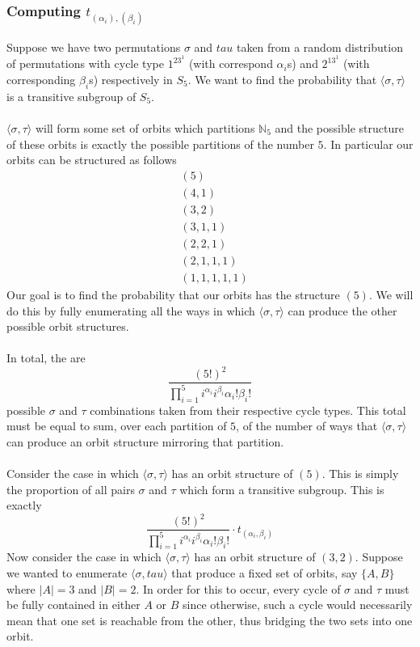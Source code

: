 \subsubsection{Computing $t_{(\alpha_i), (\beta_i)}$}
Suppose we have two permutations $\sigma$ and $tau$ taken from a random distribution of permutations with cycle type $1^23^1$ (with correspond $\alpha_i$s)  and $2^13^1$ (with corresponding $\beta_i$s) respectively in $S_5$. We want to find the probability that $\langle \sigma, \tau \rangle$ is a transitive subgroup of $S_5$.
\\\\$\langle \sigma, \tau \rangle$ will form some set of orbits which partitions $\mathbb{N}_5$ and the possible structure of these orbits is exactly the possible partitions of the number $5$. In particular our orbits can be structured as follows
	\begin{align*}
		 & (5)             \\
		 & (4, 1)          \\
		 & (3, 2)          \\
		 & (3, 1, 1)       \\
		 & (2, 2, 1)       \\
		 & (2, 1, 1, 1)    \\
		 & (1, 1, 1, 1, 1)
	\end{align*}
	Our goal is to find the probability that our orbits has the structure $(5)$. We will do this by fully enumerating all the ways in which $\langle \sigma, \tau \rangle$ can produce the other possible orbit structures.
	\\\\In total, the are
	\[
		\frac{(5!)^2}{\prod_{i=1}^{5}i^{\alpha_i}i^{\beta_i}\alpha_i!\beta_i!}
	\]
	possible $\sigma$ and $\tau$ combinations taken from their respective cycle types. This total must be equal to sum, over each partition of $5$, of the number of ways that  $\langle \sigma, \tau \rangle$ can produce an orbit structure mirroring that partition.
	\\\\Consider the case in which $\langle \sigma, \tau \rangle$ has an orbit structure of $(5)$. This is simply the proportion of all pairs $\sigma$ and $\tau$ which form a transitive subgroup. This is exactly
	\[
		\frac{(5!)^2}{\prod_{i=1}^{5}i^{\alpha_i}i^{\beta_i}\alpha_i!\beta_i!}\cdot t_{(\alpha_i, \beta_i)}
	\]
	Now consider the case in which $\langle \sigma, \tau \rangle$ has an orbit structure of $(3, 2)$. Suppose we wanted to enumerate $\langle \sigma, tau \rangle$ that produce a fixed set of orbits, say $\{A,B\}$ where $|A| = 3$ and $|B| = 2$. In order for this to occur, every cycle of $\sigma$ and $\tau$ must be fully contained in either $A$ or $B$ since otherwise, such a cycle would necessarily mean that one set is reachable from the other, thus bridging the two sets into one orbit.
